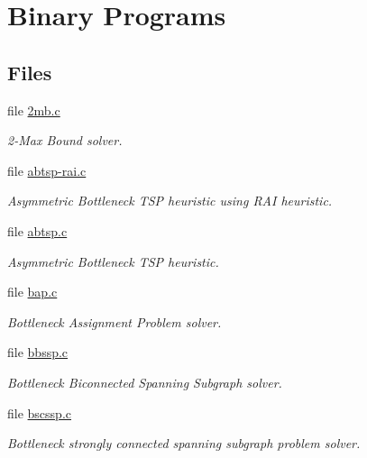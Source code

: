 \hypertarget{group__bin}{
\section{Binary Programs}
\label{group__bin}
}
\subsection*{Files}
\begin{CompactItemize}
\item 
file \hyperlink{bin_22mb_8c}{2mb.c}
\begin{CompactList}\small\item\em 2-Max Bound solver. \item\end{CompactList}

\item 
file \hyperlink{abtsp-rai_8c}{abtsp-rai.c}
\begin{CompactList}\small\item\em Asymmetric Bottleneck TSP heuristic using RAI heuristic. \item\end{CompactList}

\item 
file \hyperlink{abtsp_8c}{abtsp.c}
\begin{CompactList}\small\item\em Asymmetric Bottleneck TSP heuristic. \item\end{CompactList}

\item 
file \hyperlink{bin_2bap_8c}{bap.c}
\begin{CompactList}\small\item\em Bottleneck Assignment Problem solver. \item\end{CompactList}

\item 
file \hyperlink{bin_2bbssp_8c}{bbssp.c}
\begin{CompactList}\small\item\em Bottleneck Biconnected Spanning Subgraph solver. \item\end{CompactList}

\item 
file \hyperlink{bin_2bscssp_8c}{bscssp.c}
\begin{CompactList}\small\item\em Bottleneck strongly connected spanning subgraph problem solver. \item\end{CompactList}


\end{CompactItemize}
